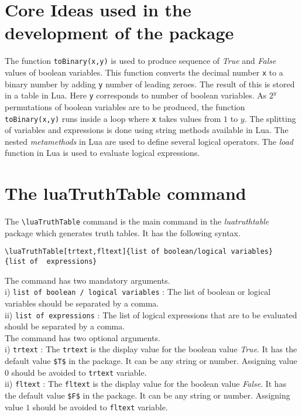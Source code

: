 \documentclass{article}
\begin{document}
\section{Core Ideas used in the development of the package} The function \verb|toBinary(x,y)| is used to produce sequence of \emph{True} and \emph{False} values  of boolean variables. This function converts the decimal number \verb|x| to a binary number by adding \verb|y| number of leading zeroes. The result of this is stored in a table in Lua.  Here \verb|y| corresponds to number of boolean variables. As  \(2^y\) permutations of boolean variables are to be produced, the function \verb|toBinary(x,y)| runs inside a loop where  \verb|x|  takes values from \(1\) to \(y\). The splitting of variables and expressions is done using string methods available in Lua. The nested \emph{metamethods} in Lua are used to define several logical operators. The \emph{load} function in Lua is used to evaluate logical expressions. 
\section{The luaTruthTable command}
The \verb|\luaTruthTable| command is the main command in the \emph{luatruthtable} package which generates truth tables. It has the following syntax.
\begin{lstlisting}[caption={[]}]
\luaTruthTable[trtext,fltext]{list of boolean/logical variables}
{list of  expressions}
\end{lstlisting}
The command has two mandatory arguments. \\
i) \verb|list of boolean / logical variables| : The list of boolean or logical variables should be separated by a comma.  \\
ii) \verb|list of expressions| : The list of logical expressions that are to be evaluated should be separated by a comma. \\
The command has two optional arguments. \\
i) \verb|trtext| : The \verb|trtext| is the display value for the boolean value \emph{True}. It has the default value \verb|$T$| in the package. It can be any string or number.  Assigning value \(0\) should be avoided to  \verb|trtext| variable.   \\
ii) \verb|fltext| : The \verb|fltext| is the display value for the boolean value \emph{False}. It has the default value \verb|$F$| in the package. It can be any string or number.  Assigning value \(1\) should be avoided to  \verb|fltext| variable.  
\end{document}
